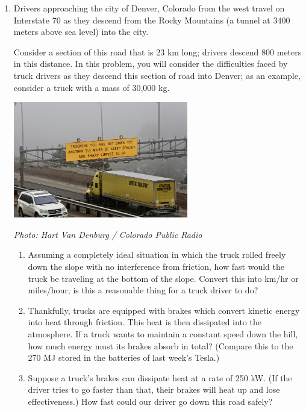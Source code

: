 \documentclass[12pt]{article}
\begin{document}
\begin{enumerate}
\item Drivers approaching the city of Denver, Colorado from the west travel on Interstate 70 as they descend from the Rocky Mountains (a tunnel at 3400 meters above sea level) into the city. 
\medskip

\begin{minipage}{3in}
Consider a section of this road that is 23 km long; drivers descend 800 meters in this distance. In this problem, you will consider the difficulties faced by truck drivers as they descend this section of road into Denver; as an example, consider a truck with a mass of 30,000 kg.

\end{minipage}
\begin{minipage}{4in}
\begin{center}
\includegraphics[width=3in]{trucker-sign.jpg}

\tiny \it Photo: Hart Van Denburg / Colorado Public Radio

\end{center}
\end{minipage}
\medskip



\begin{enumerate}
	\item Assuming a completely ideal situation in which the truck rolled freely down the slope with no interference from friction, how fast would the truck be traveling at the bottom of the slope. Convert this into km/hr or miles/hour; is this a reasonable thing for a truck driver to do?
	
	\item Thankfully, trucks are equipped with brakes which convert kinetic energy into heat through friction. This heat is then dissipated into the atmosphere. If a truck wants to maintain a constant speed down the hill, how much energy must its brakes absorb in total? (Compare this to the 270 MJ stored in the batteries of last week's Tesla.)
	
	\item Suppose a truck's brakes can dissipate heat at a rate of 250 kW. (If the driver tries to go faster than that, their brakes will heat up and lose effectiveness.) How fast could our driver go down this road safely? 
	

\end{enumerate}
\end{enumerate}
\end{document}
